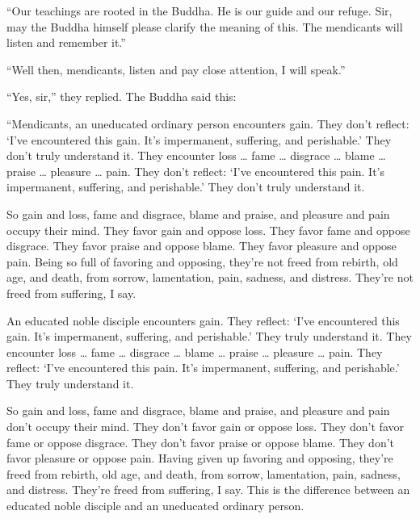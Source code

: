 \documentclass[12pt,openany]{book}%
\begin{document}
“Our teachings are rooted in the Buddha. He is our guide and our refuge. Sir, may the Buddha himself please clarify the meaning of this. The mendicants will listen and remember it.” 

“Well then, mendicants, listen and pay close attention, I will speak.” 

“Yes, sir,” they replied. The Buddha said this: 

“Mendicants, an uneducated ordinary person encounters gain. They don’t reflect: ‘I’ve encountered this gain. It’s impermanent, suffering, and perishable.’ They don’t truly understand it. They encounter loss … fame … disgrace … blame … praise … pleasure … pain. They don’t reflect: ‘I’ve encountered this pain. It’s impermanent, suffering, and perishable.’ They don’t truly understand it. 

So gain and loss, fame and disgrace, blame and praise, and pleasure and pain occupy their mind. They favor gain and oppose loss. They favor fame and oppose disgrace. They favor praise and oppose blame. They favor pleasure and oppose pain. Being so full of favoring and opposing, they’re not freed from rebirth, old age, and death, from sorrow, lamentation, pain, sadness, and distress. They’re not freed from suffering, I say. 

An educated noble disciple encounters gain. They reflect: ‘I’ve encountered this gain. It’s impermanent, suffering, and perishable.’ They truly understand it. They encounter loss … fame … disgrace … blame … praise … pleasure … pain. They reflect: ‘I’ve encountered this pain. It’s impermanent, suffering, and perishable.’ They truly understand it. 

So gain and loss, fame and disgrace, blame and praise, and pleasure and pain don’t occupy their mind. They don’t favor gain or oppose loss. They don’t favor fame or oppose disgrace. They don’t favor praise or oppose blame. They don’t favor pleasure or oppose pain. Having given up favoring and opposing, they’re freed from rebirth, old age, and death, from sorrow, lamentation, pain, sadness, and distress. They’re freed from suffering, I say. This is the difference between an educated noble disciple and an uneducated ordinary person. 
\end{document}
